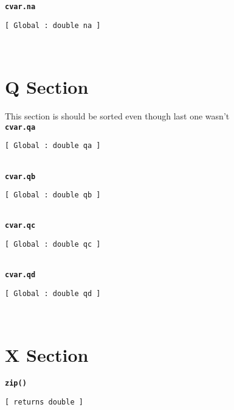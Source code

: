 {\tt \bf cvar.na }
\\
\makebox[0.5in]{}\begin{minipage}[t]{6in}
{\tt [ Global : double  na ]  }\\

\end{minipage}\\

\section{Q Section}   This section is should be sorted even though last one wasn't   
\\{\tt \bf cvar.qa }
\\
\makebox[0.5in]{}\begin{minipage}[t]{6in}
{\tt [ Global : double  qa ]  }\\

\end{minipage}\\

{\tt \bf cvar.qb }
\\
\makebox[0.5in]{}\begin{minipage}[t]{6in}
{\tt [ Global : double  qb ]  }\\

\end{minipage}\\

{\tt \bf cvar.qc }
\\
\makebox[0.5in]{}\begin{minipage}[t]{6in}
{\tt [ Global : double  qc ]  }\\

\end{minipage}\\

{\tt \bf cvar.qd }
\\
\makebox[0.5in]{}\begin{minipage}[t]{6in}
{\tt [ Global : double  qd ]  }\\

\end{minipage}\\

\section{X Section}{\tt \bf zip() }
\\
\makebox[0.5in]{}\begin{minipage}[t]{6in}
{\tt [ returns double  ]  }\\

\end{minipage}\\




